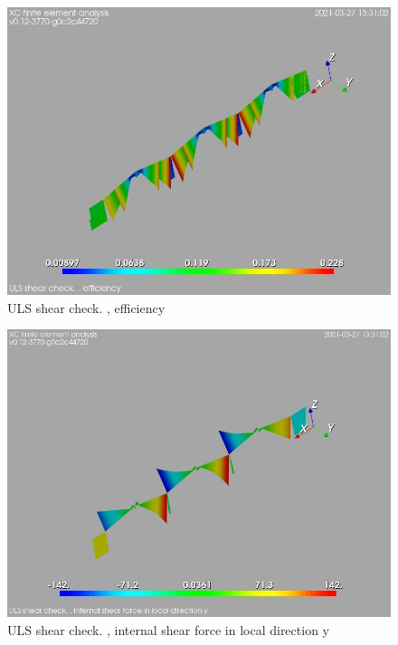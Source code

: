 \begin{figure}
\begin{center}
\includegraphics[width=\linewidth]{calc_results/sole_zeinali/text/graphics/shearULS/allMemberSetCF}
\caption{ULS shear check. , efficiency}
\end{center}
\end{figure}
\begin{figure}
\begin{center}
\includegraphics[width=\linewidth]{calc_results/sole_zeinali/text/graphics/shearULS/allMemberSetVy}
\caption{ULS shear check. , internal shear force in local direction y}
\end{center}
\end{figure}
